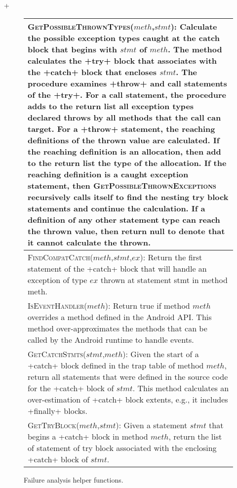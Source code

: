 \lstMakeShortInline[basicstyle=\scriptsize\ttfamily,keywordstyle=\color{DarkPurple},breaklines=true]+

\begin{figure}[t]
\scriptsize
\renewcommand*{\arraystretch}{1.3}
\begin{tabular}{|p{3.3in}|}
\hline 

\textsc{GetPossibleThrownTypes}($meth$,$stmt$): Calculate the
possible exception types caught at the catch block that begins with
$stmt$ of $meth$. The method calculates the
+try+ block that associates with the +catch+ block
that encloses $stmt$. The procedure examines +throw+
and call statements of the +try+.  For a call statement, the
procedure adds to the return list all exception types declared throws
by all methods that the call can target.  For a +throw+
statement, the reaching definitions of the thrown value are
calculated.  If the reaching definition is an allocation, then add to
the return list the type of the allocation.  If the reaching
definition is a caught exception statement, then
\textsc{GetPossibleThrownExceptions} recursively calls itself to find
the nesting try block statements and continue the calculation.  If a
definition of any other statement type can reach the thrown value,
then return null to denote that it cannot calculate the
thrown.  
\\
\hline
\textsc{FindCompatCatch}($meth$,$stmt$,$ex$): Return the first
  statement of the +catch+ block that will handle an
  exception of type $ex$ thrown at statement stmt in method meth.
\\
\hline
\textsc{IsEventHandler}($meth$): Return true if method $meth$
  overrides a method defined in the Android API.  This method
  over-approximates the methods that can be called by the Android
  runtime to handle events.
\\
\hline
\textsc{GetCatchStmts}($stmt$,$meth$): Given the start of a
+catch+ block defined in the trap table of method $meth$,
return all statements that were defined in the source code for the
+catch+ block of $stmt$.  This method calculates an
over-estimation of +catch+ block extents, e.g., it includes
+finally+ blocks.
\\
\hline
\textsc{GetTryBlock}($meth$,$stmt$): Given a statement $stmt$
  that begins a +catch+ block in method $meth$, return the
  list of statement of try block associated with the enclosing
  +catch+ block of $stmt$.
\\
\hline
\end{tabular}
\caption{\label{fig:helper-funs}Failure analysis helper functions.}
\vspace{-0.1in}
\end{figure}

